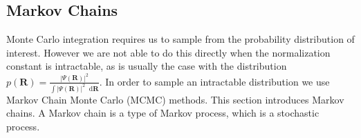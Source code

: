 \documentclass[twoside,english]{uiofysmaster}
\newcommand*\dif{\mathop{}\!\mathrm{d}}
\begin{document}
\begin{comment}
Toulouse {\em et al} \cite{Toulouse2016} give the definition of the local
energy as: The expectation value of an operator $\hat{O}$ can be
computed by averaging the corresponding local value
\begin{align}
	O(\bm{R}_f) = \frac{ \langle \bm{R}_f | \hat{O} |\Psi \rangle }{ \langle \bm{R}_f | \Psi \rangle },
\end{align}
at the Monte Carlo points $\bm{R}_f$ after the accept/reject step.

Umrigar \cite{Umrigar1999} defines $E_L$, or generally a \textbf{configurational eigenvalue} $X (\bm{R})$ as
\begin{align}
	X(\bm{R}) \Psi(\bm{R}) = \langle \bm{R} | \hat{X} | \Psi(\bm{R}) \rangle
	 = \sum_{\bm{R}'} \langle \bm{R} | \hat{X} | \bm{R}' \rangle \langle \bm{R}' | \Psi \rangle,
\end{align}
For more details on why we for example need operators that are diagnoal/near diagonal in the used basis, see 
for example Ref.~\cite{Umrigar1999}.
\end{comment}







\subsection{Markov Chains}
\label{sec:MarkovChains}

Monte Carlo integration requires us to sample from the probability
distribution of interest. However we are not able to do this directly
when the normalization constant is intractable, as is usually the case with the distribution 
$p(\bm{R}) = \frac{| \Psi(\bm{R})|^2 }{ \int | \Psi(\bm{R})|^2 \dif \bm{R} }$. In order
to sample an intractable distribution we use Markov Chain Monte Carlo (MCMC) methods. This section introduces Markov chains. A Markov chain is a type of Markov process, which is a 
stochastic process. 
\end{document}
